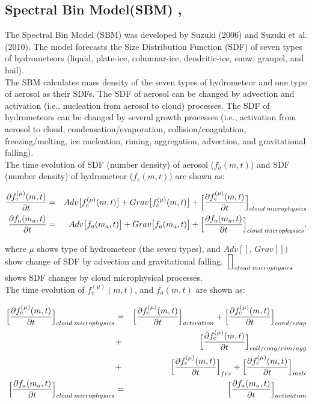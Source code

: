\subsection{Spectral Bin Model(SBM) \cite{suzuki_etal_2010}, \cite{suzuki_2006}}
The Spectral Bin Model (SBM) was developed by Suzuki (2006)\cite{suzuki_2006} and Suzuki et al. (2010)\cite{suzuki_etal_2010}. The model forecasts the Size Distribution Function (SDF) of seven types of hydrometeors (liquid, plate-ice, columnar-ice, dendritic-ice, snow, graupel, and hail). \\
The SBM calculates mass density of the seven types of hydrometeor and one type of aerosol as their SDFs. The SDF of aerosol can be changed by advection and activation (i.e., nucleation from aerosol to cloud) processes. The SDF of hydrometeors can be changed by several growth processes (i.e., activation from aerosol to cloud, condensation/evaporation, collision/coagulation, freezing/melting, ice nucleation, riming, aggregation, advection, and gravitational falling). \\
The time evolution of SDF (number density) of aerosol ($f_{a}(m,t)$) and SDF (number density) of hydrometeor ($f_{c}(m,t)$) are shown as:

\begin{eqnarray}
\frac{\partial f^{(\mu)}_{c}(m,t)}{\partial t}&=&Adv\bigl[f^{(\mu)}_{c}(m,t)\bigr]+Grav\bigl[f^{(\mu)}_{c}(m,t)\bigr]+\Bigl[ \frac{\partial f^{(\mu)}_{c}(m,t)}{\partial t}\Bigr ]_{cloud\;microphysics}\label{s10-1}\\
\frac{\partial f_{a}(m_{a},t)}{\partial t}&=&Adv\bigl[f_{a}(m_{a},t)\bigr]+Grav\bigl[f_{a}(m_{a},t)\bigr]+\Bigl[ \frac{\partial f_{a}(m_{a},t)}{\partial t} \Bigr ]_{cloud\;microphysics}.\label{s10-2}
\end{eqnarray}

where $\mu$ shows type of hydrometeor (the seven types), and $Adv[]$, $Grav[])$ show change of SDF by  advection and gravitational falling. $\Bigl[ \Bigr]_{cloud\;microphysics}$ shows SDF changes by cloud microphysical processes.\\
The time evolution of $f_{c}^{(\mu)}(m,t)$, and $f_{a}(m,t)$ are shown as:

\begin{eqnarray}
\Bigl[ \frac{\partial f_{c}^{(\mu)}(m,t)}{\partial t}\Bigl]_{cloud\;microphysics}&=&\Bigl[\frac{\partial f_{c}^{(\mu)}(m,t)}{\partial t}\Bigr]_{activation}+\Bigl[\frac{\partial f_{c}^{(\mu)}(m,t)}{\partial t}\Bigr]_{cond/evap}\nonumber\\
&+&\Bigl[\frac{\partial f_{c}^{(\mu)}(m,t)}{\partial t}\Bigr]_{coll/coag/rim/agg}\nonumber\\
&+&\Bigl[\frac{\partial f_{c}^{(\mu)}(m,t)}{\partial t}\Bigr]_{frz}+\Bigl[\frac{\partial f_{c}^{(\mu)}(m,t)}{\partial t}\Bigr]_{melt}\nonumber\\
\Bigl[ \frac{\partial f_{a}(m_{a},t)}{\partial t}\Bigl]_{cloud\;microphysics}&=&\Bigl[\frac{\partial f_{a}(m_{a},t)}{\partial t}\Bigr]_{activation}\nonumber
\end{eqnarray}

